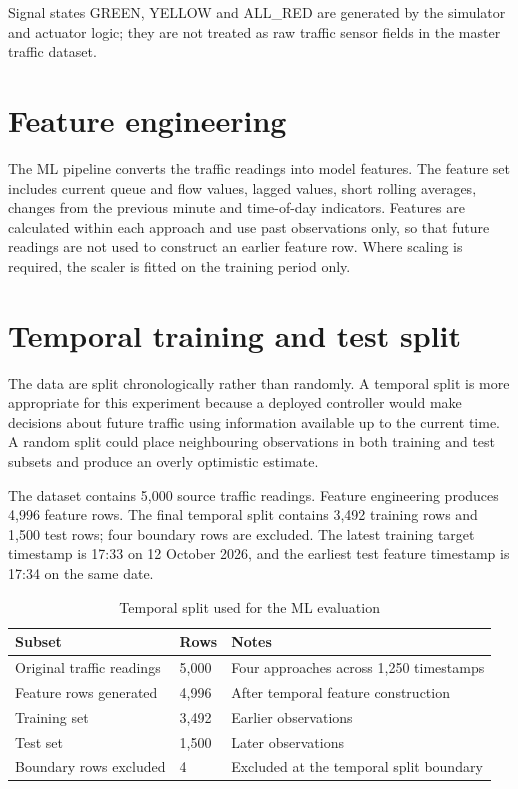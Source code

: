 \documentclass[12pt,a4paper,oneside]{report}
\begin{document}
Signal states GREEN, YELLOW and ALL\_RED are generated by the simulator and actuator logic; they are not treated as raw traffic sensor fields in the master traffic dataset.

\section{Feature engineering}
The ML pipeline converts the traffic readings into model features. The feature set includes current queue and flow values, lagged values, short rolling averages, changes from the previous minute and time-of-day indicators. Features are calculated within each approach and use past observations only, so that future readings are not used to construct an earlier feature row. Where scaling is required, the scaler is fitted on the training period only.

\section{Temporal training and test split}
The data are split chronologically rather than randomly. A temporal split is more appropriate for this experiment because a deployed controller would make decisions about future traffic using information available up to the current time. A random split could place neighbouring observations in both training and test subsets and produce an overly optimistic estimate.

The dataset contains 5,000 source traffic readings. Feature engineering produces 4,996 feature rows. The final temporal split contains 3,492 training rows and 1,500 test rows; four boundary rows are excluded. The latest training target timestamp is 17:33 on 12 October 2026, and the earliest test feature timestamp is 17:34 on the same date.

\begin{table}[htbp]\centering\small
\caption{Temporal split used for the ML evaluation}\label{tab:split}
\begin{tabular}{|p{}|p{}|p{}|}\hline
\textbf{Subset} & \textbf{Rows} & \textbf{Notes} \\\hline
Original traffic readings & 5,000 & Four approaches across 1,250 timestamps \\\hline
Feature rows generated & 4,996 & After temporal feature construction \\\hline
Training set & 3,492 & Earlier observations \\\hline
Test set & 1,500 & Later observations \\\hline
Boundary rows excluded & 4 & Excluded at the temporal split boundary \\\hline
\end{tabular}\end{table}
\end{document}

